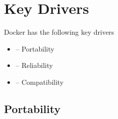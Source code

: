 
\section{Key Drivers}
\label{sec:keydrivers}


Docker has the following key drivers
\begin{itemize}
	\item {}-- Portability
	\item {}-- Reliability
	\item {}-- Compatibility

\end{itemize}
%
\subsection{Portability}
%

%



